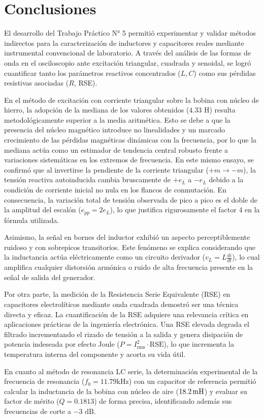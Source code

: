 \chapter{Conclusiones}

El desarrollo del Trabajo Práctico N° 5 permitió experimentar y validar métodos indirectos para la caracterización de
inductores y capacitores reales mediante instrumental convencional de laboratorio. A través del análisis de las formas
de onda en el osciloscopio ante excitación triangular, cuadrada y senoidal, se logró cuantificar tanto los parámetros
reactivos concentrados ($L, C$) como sus pérdidas resistivas asociadas ($R$, RSE).

En el método de excitación con corriente triangular sobre la bobina con núcleo de hierro, la adopción de la mediana de los
valores obtenidos ($4.33\text{ H}$) resulta metodológicamente superior a la media aritmética. Esto se debe a que la
presencia del núcleo magnético introduce no linealidades y un marcado crecimiento de las pérdidas magnéticas dinámicas
con la frecuencia, por lo que la mediana actúa como un estimador de tendencia central robusto frente a variaciones
sistemáticas en los extremos de frecuencia. En este mismo ensayo, se confirmó que al invertirse la pendiente de la corriente
triangular ($+m \to -m$), la tensión reactiva autoinducida cambia bruscamente de $+e_L$ a $-e_L$ debido a la condición
de corriente inicial no nula en los flancos de conmutación. En consecuencia, la variación total de tensión observada
de pico a pico es el doble de la amplitud del escalón ($e_{pp} = 2 e_L$), lo que justifica rigurosamente el factor 4 en la
fórmula utilizada.

Asimismo, la señal en bornes del inductor exhibió un aspecto perceptiblemente ruidoso y con sobrepicos transitorios.
Este fenómeno se explica considerando que la inductancia actúa eléctricamente como un circuito derivador
($v_L = L \frac{di}{dt}$), lo cual amplifica cualquier distorsión armónica o ruido de alta frecuencia presente en la
señal de salida del generador.

Por otra parte, la medición de la Resistencia Serie Equivalente (RSE) en capacitores electrolíticos mediante onda
cuadrada demostró ser una técnica directa y eficaz. La cuantificación de la RSE adquiere una relevancia crítica en
aplicaciones prácticas de la ingeniería electrónica. Una RSE elevada degrada el filtrado incrementando el rizado de
tensión a la salida y genera disipación de potencia indeseada por efecto Joule ($P = I_{\text{rms}}^2 \cdot
\text{RSE}$), lo que incrementa la temperatura interna del componente y acorta su vida útil.

En cuanto al método de resonancia LC serie, la determinación experimental de la frecuencia de resonancia ($f_0 = 11.79\si{\kilo\hertz}$)
con un capacitor de referencia permitió calcular la inductancia de la bobina con núcleo de aire ($18.2\,\mathrm{mH}$) y evaluar su
factor de mérito ($Q = 0.1813$) de forma precisa, identificando además sus frecuencias de corte a $-3\text{ dB}$.
